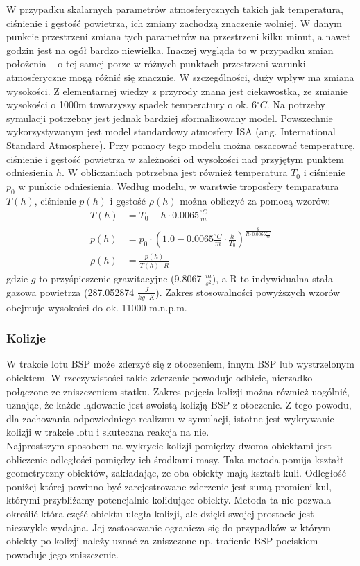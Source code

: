 W przypadku skalarnych parametrów atmosferycznych takich jak temperatura, ciśnienie i gęstość powietrza, ich zmiany zachodzą znaczenie wolniej. W danym punkcie przestrzeni zmiana tych parametrów na przestrzeni kilku minut, a nawet godzin jest na ogół bardzo niewielka. Inaczej wygląda to w przypadku zmian położenia -- o tej samej porze w różnych punktach przestrzeni warunki atmosferyczne mogą różnić się znacznie. W szczególności, duży wpływ ma zmiana wysokości. Z elementarnej wiedzy z przyrody znana jest ciekawostka, ze zmianie wysokości o 1000m towarzyszy spadek temperatury o ok. 6$^{\circ}C$. Na potrzeby symulacji potrzebny jest jednak bardziej sformalizowany model. Powszechnie wykorzystywanym jest model standardowy atmosfery ISA (ang. International Standard Atmosphere). Przy pomocy tego modelu można oszacować temperaturę, ciśnienie i gęstość powietrza w zależności od wysokości nad przyjętym punktem odniesienia $h$. W obliczaniach potrzebna jest również temperatura $T_0$ i ciśnienie $p_0$ w punkcie odniesienia. Według modelu, w warstwie troposfery temparatura $T(h)$, ciśnienie $p(h)$ i gęstość $\rho(h)$ można obliczyć za pomocą wzorów:
\[
	\begin{aligned}
	T(h) & = T_0 - h \cdot 0.0065 \frac{^\circ C}{m}\\
	p(h) & = p_0 \cdot \left(1.0 - 0.0065 \frac{^\circ C}{m} \cdot \frac{h}{T_0} \right)^{\frac{g}{R \cdot  0.0065 \frac{^\circ C}{m}}}\\
	\rho(h) &  = \frac{p(h)}{T(h) \cdot R}
	\end{aligned}
\]
gdzie $g$ to przyśpieszenie grawitacyjne (9.8067 $\frac{m}{s^2}$), a R to indywidualna stała gazowa powietrza (287.052874  $\frac{J}{kg \cdot K}$). Zakres stosowalności powyższych wzorów obejmuje wysokości do ok. 11000 m.n.p.m.

\subsubsection{Kolizje}

W trakcie lotu BSP może zderzyć się z otoczeniem, innym BSP lub wystrzelonym obiektem. W rzeczywistości takie zderzenie powoduje odbicie, nierzadko połączone ze zniszczeniem statku. Zakres pojęcia kolizji można również uogólnić, uznając, że każde lądowanie jest swoistą kolizją BSP z otoczenie. Z tego powodu, dla zachowania odpowiedniego realizmu w symulacji, istotne jest wykrywanie kolizji w trakcie lotu i skuteczna reakcja na nie.\\

Najprostszym sposobem na wykrycie kolizji pomiędzy dwoma obiektami jest obliczenie odległości pomiędzy ich środkami masy. Taka metoda pomija kształt geometryczny obiektów, zakładając, ze oba obiekty mają kształt kuli. Odległość poniżej której powinno być zarejestrowane zderzenie jest sumą promieni kul, którymi przybliżamy potencjalnie kolidujące obiekty. Metoda ta nie pozwala określić która część obiektu uległa kolizji, ale dzięki swojej prostocie jest niezwykle wydajna. Jej zastosowanie ogranicza się do przypadków w którym obiekty po kolizji należy uznać za zniszczone np. trafienie BSP pociskiem powoduje jego zniszczenie.\\

